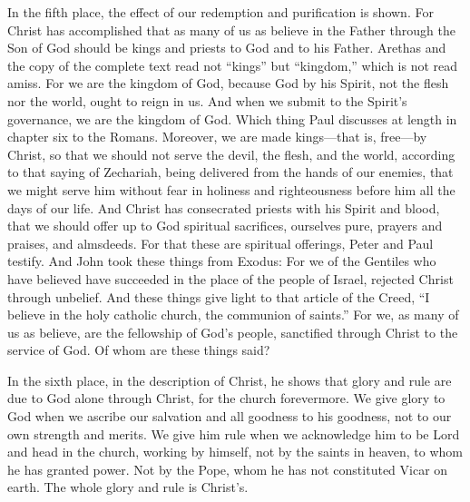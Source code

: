In the fifth place, the effect of our redemption and purification is shown. For Christ has accomplished that as many of us as believe in the Father through the Son of God should be kings and priests to God and to his Father. Arethas and the copy of the complete text read not “kings” but “kingdom,” which is not read amiss. For we are the kingdom of God, because God by his Spirit, not the flesh nor the world, ought to reign in us. And when we submit to the Spirit’s governance, we are the kingdom of God. Which thing Paul discusses at length in chapter six to the Romans. Moreover, we are made kings—that is, free—by Christ, so that we should not serve the devil, the flesh, and the world, according to that saying of Zechariah, being delivered from the hands of our enemies, that we might serve him without fear in holiness and righteousness before him all the days of our life. And Christ has consecrated priests with his Spirit and blood, that we should offer up to God spiritual sacrifices, ourselves pure, prayers and praises, and almsdeeds. For that these are spiritual offerings, Peter and Paul testify. And John took these things from Exodus: For we of the Gentiles who have believed have succeeded in the place of the people of Israel, rejected Christ through unbelief. And these things give light to that article of the Creed, “I believe in the holy catholic church, the communion of saints.” For we, as many of us as believe, are the fellowship of God’s people, sanctified through Christ to the service of God. Of whom are these things said?

In the sixth place, in the description of Christ, he shows that glory and rule are due to God alone through Christ, for the church forevermore. We give glory to God when we ascribe our salvation and all goodness to his goodness, not to our own strength and merits. We give him rule when we acknowledge him to be Lord and head in the church, working by himself, not by the saints in heaven, to whom he has granted power. Not by the Pope, whom he has not constituted Vicar on earth. The whole glory and rule is Christ’s.

